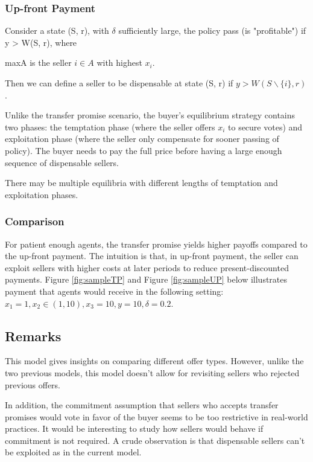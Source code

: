 \documentclass[ProjectGAZ]{subfiles}
\begin{document}
\subsubsection{Up-front Payment}

Consider a state (S, r), with $\delta$ sufficiently large, the policy pass (is "profitable") if y > W(S, r), where



maxA is the seller $i\in A$ with highest $x_i$.

Then we can define a seller to be dispensable at state (S, r) if $y > W(S\backslash \{i\}, r)$.

Unlike the transfer promise scenario, the buyer's equilibrium strategy contains two phases: the temptation phase (where the seller offers $x_i$ to secure votes) and exploitation phase (where the seller only compensate for sooner passing of policy). The buyer needs to pay the full price before having a large enough sequence of dispensable sellers.

There may be multiple equilibria with different lengths of temptation and exploitation phases.

\subsubsection{Comparison}

For patient enough agents, the transfer promise yields higher payoffs compared to the up-front payment. The intuition is that, in up-front payment, the seller can exploit sellers with higher costs at later periods to reduce present-discounted payments. Figure \ref{fig:sampleTP} and Figure \ref{fig:sampleUP} below illustrates payment that agents would receive in the following setting: $x_1 = 1, x_2 \in (1, 10), x_3 = 10, y = 10, \delta = 0.2$.






\subsection{Remarks}

This model gives insights on comparing different offer types. However, unlike the two previous models, this model doesn't allow for revisiting sellers who rejected previous offers.

In addition, the commitment assumption that sellers who accepts transfer promises would vote in favor of the buyer seems to be too restrictive in real-world practices. It would be interesting to study how sellers would behave if commitment is not required. A crude observation is that dispensable sellers can't be exploited as in the current model.
\end{document}
